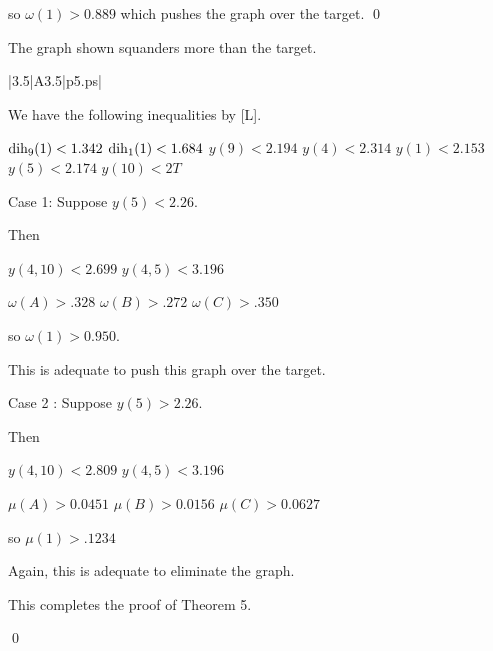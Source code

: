 so $\omega(1)>0.889$ which pushes the graph over the target. \qed



\bigskip



 The graph shown 
squanders more than the target.  \endproclaim

\gram|3.5|A3.5|p5.ps|  %


We have the following inequalities by [L].

$\operatorname{dih}_9(1) < 1.342$ \newline
$\operatorname{dih}_1(1) < 1.684$ \newline
$y(9)<2.194$ \newline
$y(4)<2.314$ \newline
$y(1)<2.153$ \newline
$y(5)<2.174$ \newline
$y(10)<2T$ \newline


Case 1: Suppose $y(5)<2.26$.

Then 

$y(4,10)<2.699$ \newline
$y(4,5)<3.196$ \newline

$\omega(A)>.328$ \newline
$\omega(B)>.272$ \newline
$\omega(C)>.350$ \newline

so $\omega(1)>0.950$.  

This is adequate to push this graph over the target.

Case 2 : Suppose $y(5)>2.26$.

Then

$y(4,10)<2.809$ \newline
$y(4,5)<3.196$ \newline

$\mu(A)>0.0451$ \newline
$\mu(B)>0.0156$ \newline
$\mu(C)>0.0627$ \newline

so $\mu(1)>.1234$

Again, this is adequate to eliminate the graph.

This completes the proof of Theorem 5.

\qed

\bigskip




